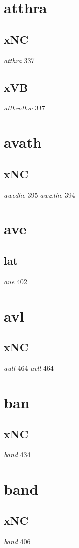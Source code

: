 \documentclass[a4paper,twocolumn]{article}
\begin{document}
\section{atthra}
\label{sec:org256813c}
\subsection{xNC}
\label{sec:org1a65613}
\emph{atthra} 337 
\subsection{xVB}
\label{sec:org7cc3550}
\emph{atthrathæ} 337 
\section{avath}
\label{sec:org633fe16}
\subsection{xNC}
\label{sec:org1d36762}
\emph{awedhe} 395 \emph{awæthe} 394 
\section{ave}
\label{sec:orgf099b72}
\subsection{lat}
\label{sec:orgc62723f}
\emph{aue} 402 
\section{avl}
\label{sec:org29f70e3}
\subsection{xNC}
\label{sec:orge7973f8}
\emph{aull} 464 \emph{avll} 464 
\section{ban}
\label{sec:orgde11cbe}
\subsection{xNC}
\label{sec:org7d60b4e}
\emph{band} 434 
\section{band}
\label{sec:org2b32e29}
\subsection{xNC}
\label{sec:org5a0358a}
\emph{band} 406 
\end{document}
